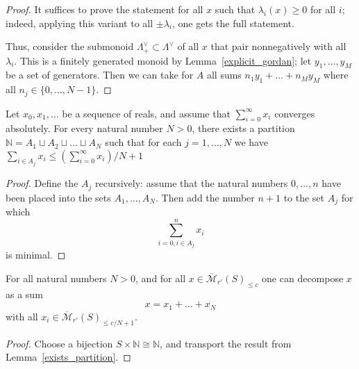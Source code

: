 \begin{proof}
  It suffices to prove the statement for all $x$ such that $\lambda_i(x)\geq 0$ for all $i$;
  indeed, applying this variant to all $\pm \lambda_i$, one gets the full statement.

  Thus, consider the submonoid $\Lambda^\vee_+\subset \Lambda^\vee$
  of all $x$ that pair nonnegatively with all $\lambda_i$.
  This is a finitely generated monoid by Lemma~\ref{explicit_gordan};
  let $y_1,\ldots,y_M$ be a set of generators.
  Then we can take for $A$ all sums $n_1y_1+\ldots+n_My_M$ where all $n_j\in \{0,\ldots,N-1\}$.
\end{proof}

\begin{lemma}
  \label{exists_partition}
  \leanok
  Let $x_0, x_1, \dots$ be a sequence of reals,
  and assume that $\sum_{i=0}^\infty x_i$ converges absolutely.
  For every natural number $N > 0$,
  there exists a partition $\mathbb N = A_1 \sqcup A_2 \sqcup \dots \sqcup A_N$
  such that for each $j = 1,\dots,N$ we have
  $\sum_{i \in A_j} x_i \le (\sum_{i=0}^\infty x_i)/N + 1$
\end{lemma}

\begin{proof}
  \leanok
  Define the $A_j$ recursively:
  assume that the natural numbers $0, \dots, n$
  have been placed into the sets $A_1, \dots, A_N$.
  Then add the number $n+1$ to the set $A_j$ for which
  \[
    \sum_{i=0, i\in A_j}^n x_i
  \]
  is minimal.
\end{proof}

\begin{lemma}
  \label{lem98_int}
  \leanok
  For all natural numbers $N > 0$,
  and for all $x\in \overline{\mathcal M}_{r'}(S)_{\leq c}$
  one can decompose $x$ as a sum
  \[
    x=x_1+\ldots+x_N
  \]
  with all $x_i\in \overline{\mathcal M}_{r'}(S)_{\leq c/N+1}$.
\end{lemma}

\begin{proof}
  \leanok
  Choose a bijection $S \times \mathbb N \cong \mathbb N$,
  and transport the result from Lemma~\ref{exists_partition}.
\end{proof}

